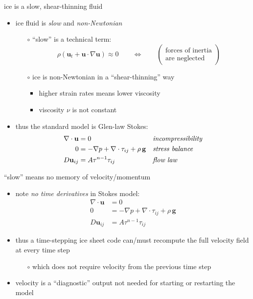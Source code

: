 \begin{frame}{ice is a slow, shear-thinning fluid}

\begin{itemize}
\item ice fluid is \emph{slow} and \emph{non-Newtonian}
    \begin{itemize}
    \item[$\circ$] ``slow'' is a technical term:
      $$\rho \left(\mathbf{u}_t + \mathbf{u}\cdot\nabla \mathbf{u}\right) \approx 0 \qquad \iff \qquad \begin{pmatrix} \text{forces of inertia} \\ \text{are neglected} \end{pmatrix}$$
    \item[$\circ$] ice is non-Newtonian in a ``shear-thinning'' way
        \begin{itemize}
        \item higher strain rates means lower viscosity
        \item viscosity $\nu$ is not constant
        \end{itemize}
    \end{itemize}

\bigskip
\item thus the standard model is Glen-law Stokes:
\begin{align*}
\nabla \cdot \mathbf{u} &= 0 &&\text{\emph{incompressibility}} \\
0 &= - \nabla p + \nabla \cdot \tau_{ij} + \rho\, \mathbf{g} &&\text{\emph{stress balance}} \\
D\mathbf{u}_{ij} &= A \tau^{n-1} \tau_{ij} &&\text{\emph{flow law}}
\end{align*}

\end{itemize}
\end{frame}


\begin{frame}{``slow'' means no memory of velocity/momentum}

\begin{itemize}
\item note \emph{no time derivatives} in Stokes model:
\small
\begin{align*}
\nabla \cdot \mathbf{u} &= 0 \\
0 &= - \nabla p + \nabla \cdot \tau_{ij} + \rho\, \mathbf{g} \\
D\mathbf{u}_{ij} &= A \tau^{n-1} \tau_{ij}
\end{align*}
\normalsize
\item thus a time-stepping ice sheet code can/must recompute the full velocity field at every time step
  \begin{itemize}
  \item[$\circ$] which does not require velocity from the previous time step
  \end{itemize}
\item velocity is a ``diagnostic'' output not needed for starting or restarting the model
\end{itemize}
\end{frame}


